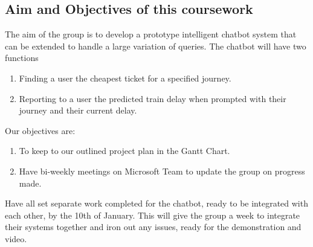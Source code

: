 \documentclass[11pt]{article}
\begin{document}
	\subsection{Aim and Objectives of this coursework} 
	The aim of the group is to develop a prototype intelligent chatbot system that can be extended to handle a large variation of queries. The chatbot will have two functions
	\begin{enumerate}
		\item Finding a user the cheapest ticket for a specified journey.
		\item 	Reporting to a user the predicted train delay when prompted with their journey and their current delay.		
	\end{enumerate}	

	Our objectives are:
	\begin{enumerate}
		\item To keep to our outlined project plan in the Gantt Chart.		
		\item Have bi-weekly meetings on Microsoft Team to update the group on progress made.		
	\end{enumerate}	
	
	Have all set separate work completed for the chatbot, ready to be integrated with each other, by the 10th of January. This will give the group a week to integrate their systems together and iron out any issues, ready for the demonstration and video.
	
\end{document}
